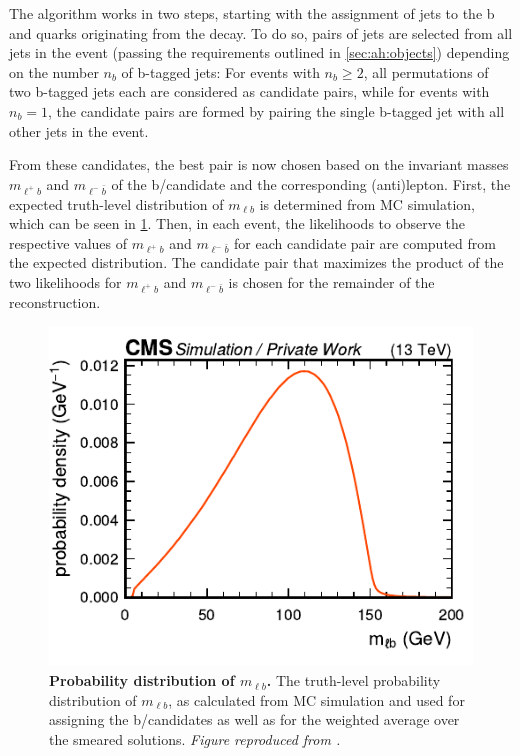 The algorithm works in two steps, starting with the assignment of jets to the b and \bbar quarks originating from the \ttbar decay. To do so, pairs of jets are selected from all jets in the event (passing the requirements outlined in \cref{sec:ah:objects}) depending on the number $n_b$ of b-tagged jets: For events with $n_b \geq 2$, all permutations of two b-tagged jets each are considered as candidate pairs, while for events with $n_b = 1$, the candidate pairs are formed by pairing the single b-tagged jet with all other jets in the event. 

From these candidates, the best pair is now chosen based on the invariant masses $m_{\ell^+ b}$ and $m_{\ell^- \bar{b}}$ of the b/\bbar candidate and the corresponding (anti)lepton. First, the expected truth-level distribution of $m_{\ell b}$ is determined from MC simulation, which can be seen in \cref{fig:ah:kinreco_mlb}. Then, in each event, the likelihoods to observe the respective 
values of $m_{\ell^+ b}$ and $m_{\ell^- \bar{b}}$ for each candidate pair are computed from the expected distribution.
The candidate pair that maximizes the product of the two likelihoods for $m_{\ell^+ b}$ and $m_{\ell^- \bar{b}}$ is chosen for the remainder of the reconstruction.

\begin{figure}[!th]
    \centering
    \includegraphics[width=0.5\linewidth]{figures/ah/kinreco/mlb.pdf}
    \caption{\textbf{Probability distribution of $m_{\ell b}$.} The truth-level probability distribution of $m_{\ell b}$, as calculated from \ttbar MC simulation and used for assigning the b/\bbar candidates as well as for the weighted average over the smeared solutions. \textit{Figure reproduced from .}}
    \label{fig:ah:kinreco_mlb}
\end{figure}

